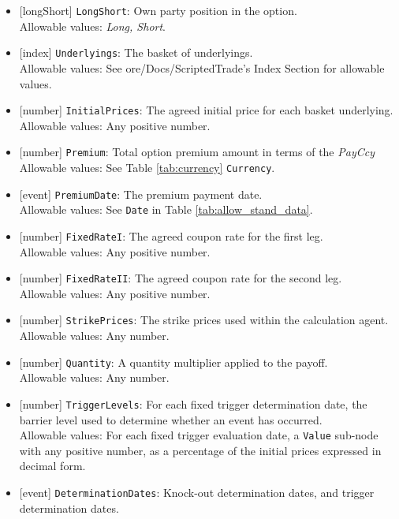 \begin{itemize}
  \item{}[longShort] \lstinline!LongShort!: Own party position in the option. \\
  Allowable values: \emph{Long, Short}.
  \item{}[index] \lstinline!Underlyings!: The basket of underlyings. \\
  Allowable values: See ore/Docs/ScriptedTrade's Index Section for allowable values.
  \item{}[number] \lstinline!InitialPrices!: The agreed initial price for each basket underlying. \\
  Allowable values: Any positive number.
  \item{}[number] \lstinline!Premium!: Total option premium amount in terms of the \emph{PayCcy} \\
  Allowable values: See Table \ref{tab:currency} \lstinline!Currency!.
  \item{}[event] \lstinline!PremiumDate!: The premium payment date. \\
  Allowable values: See \lstinline!Date! in Table \ref{tab:allow_stand_data}.
  \item{}[number] \lstinline!FixedRateI!: The agreed coupon rate for the first leg. \\
  Allowable values: Any positive number.
  \item{}[number] \lstinline!FixedRateII!: The agreed coupon rate for the second leg. \\
  Allowable values: Any positive number.
  \item{}[number] \lstinline!StrikePrices!: The strike prices used within the calculation agent. \\
  Allowable values: Any number.
  \item{}[number] \lstinline!Quantity!: A quantity multiplier applied to the payoff. \\
  Allowable values: Any number.
  \item{}[number] \lstinline!TriggerLevels!: For each fixed trigger determination date, the
  barrier level used to determine whether an event has occurred. \\
  Allowable values: For each fixed trigger evaluation date, a \lstinline!Value!
  sub-node with any positive number, as a percentage of the initial prices expressed in decimal form.
  \item{}[event] \lstinline!DeterminationDates!: Knock-out determination dates, and trigger
  determination dates. \\

\end{itemize}
